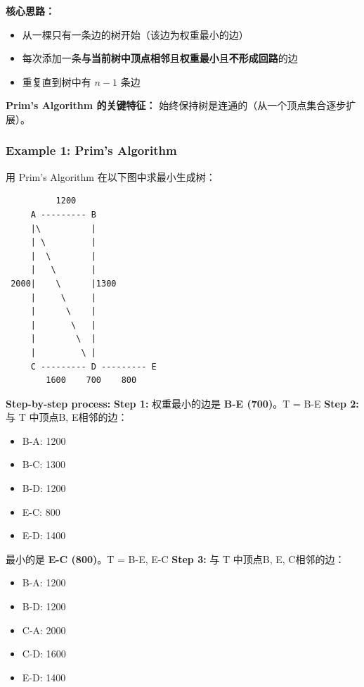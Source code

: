 \documentclass[10pt,a4paper,openany]{ctexbook}
\theoremstyle{definition}
\theoremstyle{remark}
\renewenvironment{quote}
  {\list{}{\leftmargin=1em\rightmargin=0pt\topsep=0.5pt\partopsep=0pt}\item[]}
  {\endlist}
\begin{document}
\textbf{核心思路：}
\begin{itemize}
\item 从一棵只有一条边的树开始（该边为权重最小的边）
\item 每次添加一条\textbf{与当前树中顶点相邻}且\textbf{权重最小}且\textbf{不形成回路}的边
\item 重复直到树中有 $n-1$ 条边

\end{itemize}

\begin{quote}
\textbf{Prim's Algorithm 的关键特征：} 始终保持树是连通的（从一个顶点集合逐步扩展）。

\end{quote}

\subsubsection{Example 1: Prim's Algorithm}

用 Prim's Algorithm 在以下图中求最小生成树：
{\footnotesize\begin{verbatim}
          1200
     A --------- B
     |\          |
     | \         |
     |  \        |
     |   \       |
 2000|    \      |1300
     |     \     |
     |      \    |
     |       \   |
     |        \  |
     |         \ |
     C --------- D --------- E
        1600    700    800
\end{verbatim}}

\textbf{Step-by-step process:}
\textbf{Step 1:} 权重最小的边是 \textbf{B-E (700)}。T = {B-E}
\textbf{Step 2:} 与 T 中顶点{B, E}相邻的边：
\begin{itemize}
\item B-A: 1200
\item B-C: 1300
\item B-D: 1200
\item E-C: 800
\item E-D: 1400

\end{itemize}

最小的是 \textbf{E-C (800)}。T = {B-E, E-C}
\textbf{Step 3:} 与 T 中顶点{B, E, C}相邻的边：
\begin{itemize}
\item B-A: 1200
\item B-D: 1200
\item C-A: 2000
\item C-D: 1600
\item E-D: 1400

\end{itemize}
\end{document}

